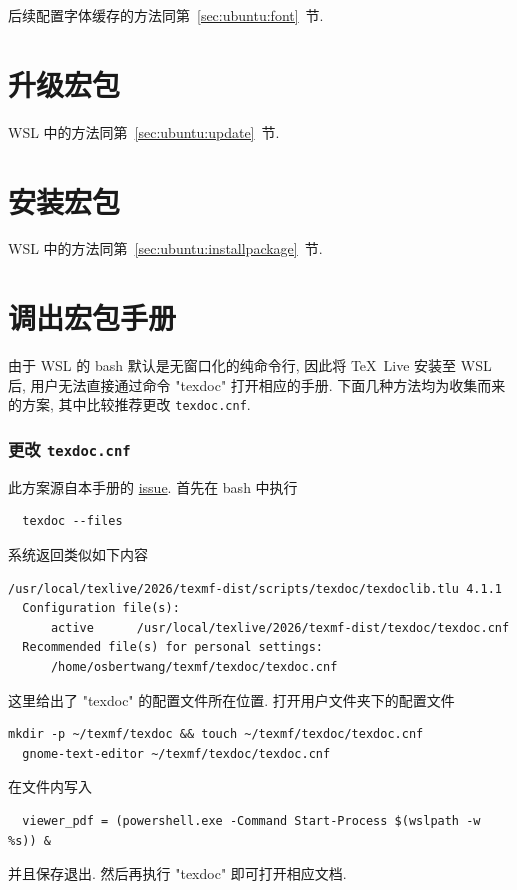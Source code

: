 后续配置字体缓存的方法同第~\ref{sec:ubuntu:font}~节.

\section{升级宏包}

WSL 中的方法同第~\ref{sec:ubuntu:update}~节.

\section{安装宏包}

WSL 中的方法同第~\ref{sec:ubuntu:installpackage}~节.

\section{调出宏包手册}

由于 WSL 的 \textsf{bash} 默认是无窗口化的纯命令行,
因此将 \TeX~Live 安装至 WSL 后,
用户无法直接通过命令 "texdoc" 打开相应的手册.
下面几种方法均为收集而来的方案,
其中比较推荐更改 \texttt{texdoc.cnf}.

\subsubsection{更改 \texttt{texdoc.cnf}}

此方案源自本手册的 \href{https://github.com/OsbertWang/install-latex-guide-zh-cn/issues/13}{issue}.
首先在 \textsf{bash} 中执行
\begin{lstlisting}
  texdoc --files
\end{lstlisting}
系统返回类似如下内容
\begin{lstlisting}[language = {}]
  /usr/local/texlive/2026/texmf-dist/scripts/texdoc/texdoclib.tlu 4.1.1
  Configuration file(s):
      active      /usr/local/texlive/2026/texmf-dist/texdoc/texdoc.cnf
  Recommended file(s) for personal settings:
      /home/osbertwang/texmf/texdoc/texdoc.cnf
\end{lstlisting}
这里给出了 "texdoc" 的配置文件所在位置.
打开用户文件夹下的配置文件
\begin{lstlisting}[deletekeywords = texdoc]
  mkdir -p ~/texmf/texdoc && touch ~/texmf/texdoc/texdoc.cnf
  gnome-text-editor ~/texmf/texdoc/texdoc.cnf
\end{lstlisting}
在文件内写入
\begin{lstlisting}
  viewer_pdf = (powershell.exe -Command Start-Process $(wslpath -w %s)) &
\end{lstlisting}
并且保存退出.
然后再执行 "texdoc" 即可打开相应文档.

